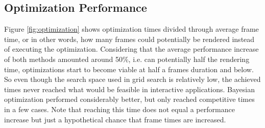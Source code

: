 \subsection{Optimization Performance}
Figure \ref{fig:optimization} shows optimization times divided through average frame time, or in other words, how many frames could potentially be rendered instead of executing the optimization. Considering that the average performance increase of both methods amounted around 50\%, i.e. can potentially half the rendering time, optimizations start to become viable at half a frames duration and below. So even though the search space used in grid search is relatively low, the achieved times never reached what would be feasible in interactive applications. Bayesian optimization performed considerably better, but only reached competitive times in a few cases. Note that reaching this time does not equal a performance increase but just a hypothetical chance that frame times are increased. 

